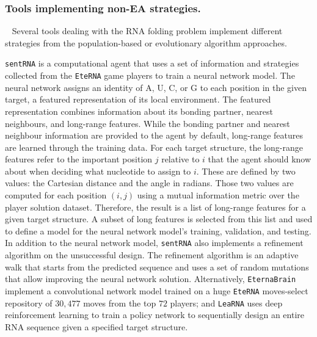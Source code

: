 \subsubsection{Tools implementing non-EA strategies.}
 
Several tools dealing with the RNA folding problem implement different strategies from the population-based or evolutionary algorithm approaches. 

\texttt{sentRNA} \cite{shi2018sentrna} is a computational agent that uses a set of information and strategies collected from the \texttt{EteRNA} game players to train a neural network model. The neural network assigns an identity of A, U, C, or G to each position in the given target, a featured representation of its local environment. The featured representation combines information about its bonding partner, nearest neighbours, and long-range features. While the bonding partner and nearest neighbour information are provided to the agent by default, long-range features are learned through the training data. For each target structure, the long-range features refer to the important position $j$ relative to $i$ that the agent should know about when deciding what nucleotide to assign to $i$. These are defined by two values: the Cartesian distance and the angle in radians. Those two values are computed for each position $(i,j)$ using a mutual information metric over the player solution dataset. Therefore, the result is a list of long-range features for a given target structure. A subset of long features is selected from this list and used to define a model for the neural network model's training, validation, and testing. In addition to the neural network model, \texttt{sentRNA} also implements a refinement algorithm on the unsuccessful design. The refinement algorithm is an adaptive walk that starts from the predicted sequence and uses a set of random mutations that allow improving the neural network solution. Alternatively, \texttt{EternaBrain} \cite{koodli2019eternabrain} implement a convolutional network model trained on a huge \texttt{EteRNA} moves-select repository of $30,477$ moves from the top $72$ players; and \texttt{LeaRNA} \cite{runge2018learning} uses deep reinforcement learning to train a policy network to sequentially design an entire RNA sequence given a specified target structure.

